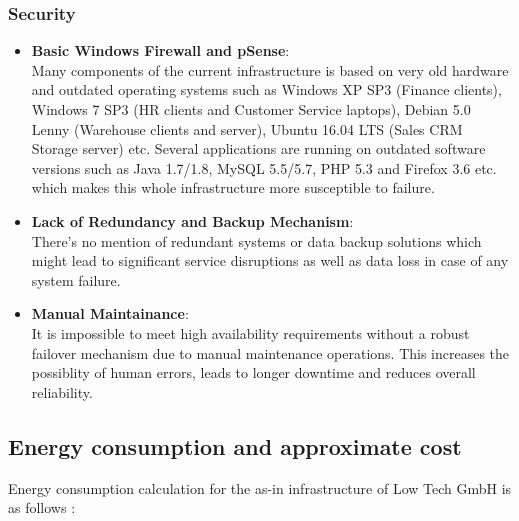 \documentclass{llncs}
\begin{document}
\subsubsection*{Security}
\begin{itemize}
  \item \textbf{Basic Windows Firewall and pSense}:
        \\
        Many components of the current infrastructure is based on very old hardware and outdated operating systems such as 
        Windows XP SP3 (Finance clients), Windows 7 SP3 (HR clients and Customer Service laptops), Debian 5.0 Lenny (Warehouse clients and server),
        Ubuntu 16.04 LTS (Sales CRM Storage server) etc. Several applications are running on outdated software versions such as Java 1.7/1.8, 
        MySQL 5.5/5.7, PHP 5.3 and Firefox 3.6 etc. which makes this whole infrastructure more susceptible to failure.
        \\
  \item \textbf{Lack of Redundancy and Backup Mechanism}:
        \\ 
        There's no mention of redundant systems or data backup solutions which might lead to significant service disruptions as well as data loss in case of any system failure.
        \\
  \item \textbf{Manual Maintainance}:
        \\It is impossible to meet high availability requirements without a robust failover mechanism due to manual maintenance operations. 
        This increases the possiblity of human errors, leads to longer downtime and reduces overall reliability.
        \\
\end{itemize}
\subsection{Energy consumption and approximate cost}

Energy consumption calculation for the as-in infrastructure of Low Tech GmbH is as follows : 
\end{document}
